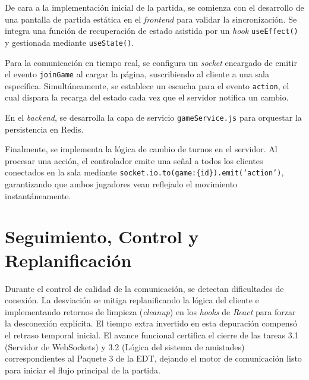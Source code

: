 De cara a la implementación inicial de la partida, se comienza con el desarrollo de una pantalla de partida estática en el \textit{frontend} para validar la sincronización. Se integra una función de recuperación de estado asistida por un \textit{hook} \texttt{useEffect()} y gestionada mediante \texttt{useState()}.

Para la comunicación en tiempo real, se configura un \textit{socket} encargado de emitir el evento \texttt{joinGame} al cargar la página, suscribiendo al cliente a una sala específica. Simultáneamente, se establece un escucha para el evento \texttt{action}, el cual dispara la recarga del estado cada vez que el servidor notifica un cambio.

En el \textit{backend}, se desarrolla la capa de servicio \texttt{gameService.js} para orquestar la persistencia en Redis.

Finalmente, se implementa la lógica de cambio de turnos en el servidor. Al procesar una acción, el controlador emite una señal a todos los clientes conectados en la sala mediante \texttt{socket.io.to(game:\{id\}).emit('action')}, garantizando que ambos jugadores vean reflejado el movimiento instantáneamente.

\section{Seguimiento, Control y Replanificación}
Durante el control de calidad de la comunicación, se detectan dificultades de conexión. La desviación se mitiga replanificando la lógica del cliente e implementando retornos de limpieza (\textit{cleanup}) en los \textit{hooks} de \textit{React} para forzar la desconexión explícita. El tiempo extra invertido en esta depuración compensó el retraso temporal inicial. El avance funcional certifica el cierre de las tareas 3.1 (Servidor de WebSockets) y 3.2 (Lógica del sistema de amistades) correspondientes al Paquete 3 de la EDT, dejando el motor de comunicación listo para iniciar el flujo principal de la partida.